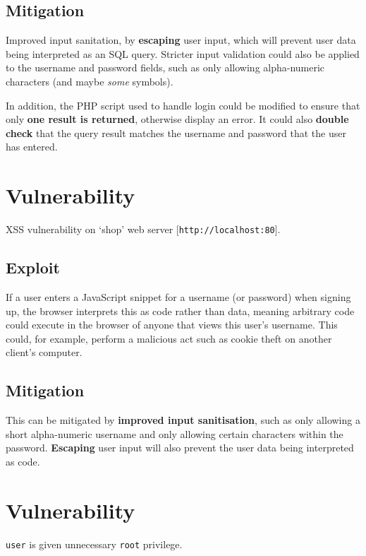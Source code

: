 \documentclass[11pt]{article}
\begin{document}
\subsection{Mitigation}

Improved input sanitation, by \textbf{escaping} user input, which will prevent user data being interpreted as an SQL query. Stricter input validation could also be applied to the username and password fields, such as only allowing alpha-numeric characters (and maybe \textit{some} symbols).

In addition, the PHP script used to handle login could be modified to ensure that only \textbf{one result is returned}, otherwise display an error. It could also \textbf{double check} that the query result matches the username and password that the user has entered.

\section{Vulnerability}

XSS vulnerability on `shop' web server [\texttt{http://localhost:80}].

\subsection{Exploit}

If a user enters a JavaScript snippet for a username (or password) when signing up, the browser interprets this as code rather than data, meaning arbitrary code could execute in the browser of anyone that views this user's username. This could, for example, perform a malicious act such as cookie theft on another client's computer.

\subsection{Mitigation}

This can be mitigated by \textbf{improved input sanitisation}, such as only allowing a short alpha-numeric username and only allowing certain characters within the password. \textbf{Escaping} user input will also prevent the user data being interpreted as code.

\section{Vulnerability}

\texttt{user} is given unnecessary \texttt{root} privilege.
\end{document}
